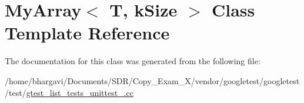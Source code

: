 \hypertarget{class_my_array}{}\section{My\+Array$<$ T, k\+Size $>$ Class Template Reference}
\label{class_my_array}


The documentation for this class was generated from the following file\+:\begin{DoxyCompactItemize}
\item 
/home/bhargavi/\+Documents/\+S\+D\+R/\+Copy\+\_\+\+Exam\+\_\+X/vendor/googletest/googletest/test/\hyperlink{gtest__list__tests__unittest___8cc}{gtest\+\_\+list\+\_\+tests\+\_\+unittest\+\_\+.\+cc}\end{DoxyCompactItemize}
